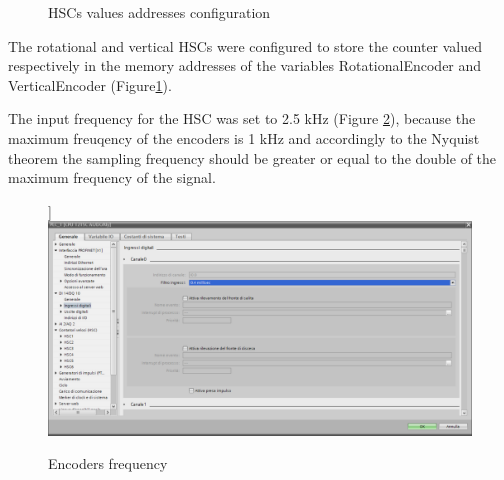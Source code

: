 \begin{figure}[!h]
\centering
{}
\qquad
{}
\caption{HSCs values addresses configuration}
\label{fig:encoder_addresses}
\end{figure}

The rotational and vertical HSCs were configured to store the counter valued respectively in the memory addresses of the variables RotationalEncoder and VerticalEncoder (Figure\ref{fig:encoder_addresses}). 

The input frequency for the HSC was set to 2.5 kHz (Figure \ref{fig:encoder_frequency}), because the maximum freuqency of the encoders is 1 kHz and accordingly to the Nyquist theorem the sampling frequency should be greater or equal to the double of the maximum frequency of the signal. 

\begin{figure}[!h]
\centering
\caption{Encoders frequency}\label{fig:encoder_frequency}]{
\includegraphics[width=0.8\linewidth]{capitolo3/figure/freq_HSC.PNG}
}

\end{figure}

